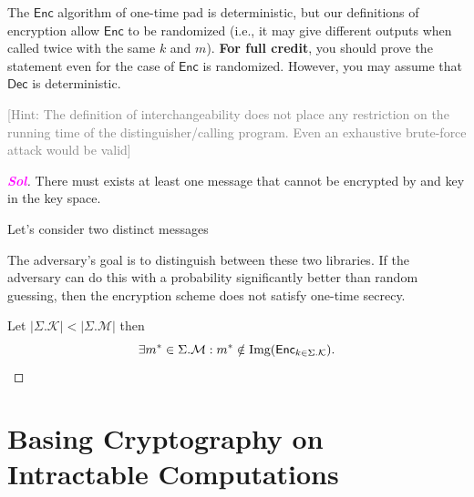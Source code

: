 \documentclass[12pt,openany]{book}
\theoremstyle{definition}
\newcommand{\img}{\operatorname{\textnormal{Img}}}
\newcommand{\ie}{\textnormal{i.e.}}
\newcommand{\abs}[1]{\left\lvert #1 \right\rvert}
\newcommand{\sol}{\textcolor{magenta}{\bf Sol}}
\newcommand{\Enc}{\mathsf{Enc}}
\newcommand{\Dec}{\mathsf{Dec}}
\newcommand{\scheme}{\Sigma}
\newcommand{\keyspace}{\mathcal{K}}
\newcommand{\messagespace}{\mathcal{M}}
\begin{document}
\begin{itemize}
		The $\Enc$ algorithm of one-time pad is deterministic, but our definitions of encryption allow $\Enc$ to be randomized (\ie, it may give different outputs when called twice with the same $k$ and $m$).
		\textbf{For full credit}, you should prove the statement even for the case of $\Enc$ is randomized. However, you may assume that $\Dec$ is deterministic.
		
		\textcolor{gray}{[Hint: The definition of interchangeability does not place any restriction on the running time of the distinguisher/calling program. Even an exhaustive brute-force attack would be valid]}
		\begin{tcolorbox}[colframe=magenta]
			\begin{proof}[\sol]
				There must exists at least one message that cannot be encrypted by and key in the key space.
				
				Let's consider two distinct messages
				
				The adversary's goal is to distinguish between these two libraries. If the adversary can do this with a probability significantly better than random guessing, then the encryption scheme does not satisfy one-time secrecy.
				
				Let \(\abs{\scheme.\keyspace}<\abs{\scheme.\messagespace}\) then \[
				\exists m^*\in\scheme.\messagespace:m^*\notin\img(\Enc_{k\in\scheme.\keyspace}).
				\]
			\end{proof}
		\end{tcolorbox}
		
	\end{itemize}
	
	\newpage
	\chapter{Basing Cryptography on Intractable Computations}
	
\end{document}
